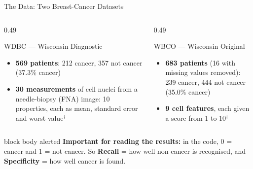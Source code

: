 \documentclass[aspectratio=169,11pt,t,xcolor={table}]{beamer}
\begin{document}
\begin{frame}{The Data: Two Breast-Cancer Datasets}
  \begin{columns}[T,onlytextwidth]
    \begin{column}{0.49\textwidth}
      \begin{block}{WDBC --- Wisconsin Diagnostic}
        \footnotesize
        \begin{itemize}
          \item \textbf{569 patients}: 212 cancer, 357 not cancer (37.3\% cancer)
          \item \textbf{30 measurements} of cell nuclei from a needle-biopsy (FNA) image: 10 properties, each as mean, standard error and worst value$^{\dagger}$
        \end{itemize}
      \end{block}
    \end{column}
    \begin{column}{0.49\textwidth}
      \begin{block}{WBCO --- Wisconsin Original}
        \footnotesize
        \begin{itemize}
          \item \textbf{683 patients} (16 with missing values removed): 239 cancer, 444 not cancer (35.0\% cancer)
          \item \textbf{9 cell features}, each given a score from 1 to 10$^{\dagger}$
        \end{itemize}
      \end{block}
    \end{column}
  \end{columns}
  \vspace{1.5mm}
  \begin{beamercolorbox}[wd=\textwidth,sep=4pt,rounded=true]{block body alerted}
    \footnotesize\textbf{\color{qred}Important for reading the results:} in the code, 0 = cancer and 1 = not cancer.
    So \textbf{Recall} = how well non-cancer is recognised, and \textbf{Specificity} = how well cancer is found.

\end{beamercolorbox}
\end{frame}
\end{document}
